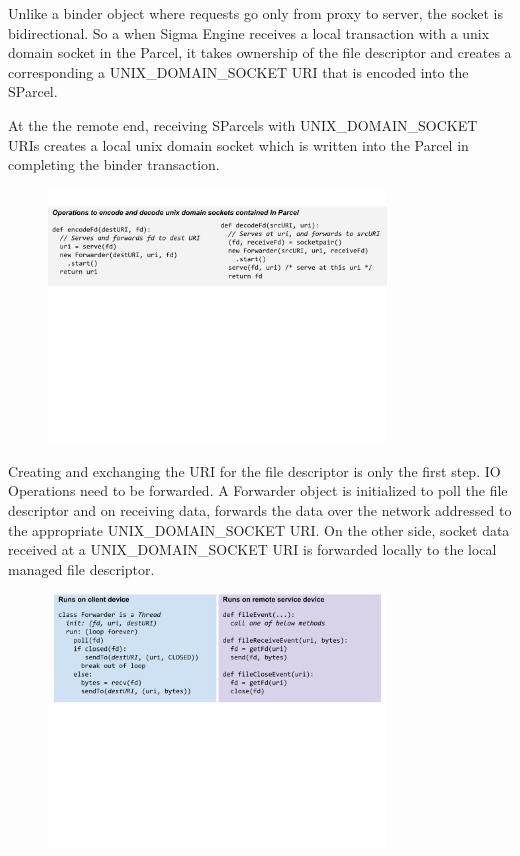 \documentclass[prodmode]{acmlarge}
\begin{document}
Unlike a binder object where requests go only from proxy to server, the socket is bidirectional. So a when Sigma Engine receives a local transaction with a unix domain socket in the Parcel, it takes ownership of the file descriptor and creates a corresponding a UNIX\_DOMAIN\_SOCKET URI that is encoded into the SParcel.

At the the remote end, receiving SParcels with UNIX\_DOMAIN\_SOCKET URIs creates a local unix domain socket which is written into the Parcel in completing the binder transaction.

\begin{figure}[h]
\centering
\includegraphics[width=0.8\textwidth]{drawings/encodeFds.pdf}
\end{figure}

Creating and exchanging the URI for the file descriptor is only the first step. IO Operations need to be forwarded. A Forwarder object is initialized to poll the file descriptor and on receiving data, forwards the data over the network addressed to the appropriate UNIX\_DOMAIN\_SOCKET URI. On the other side, socket data received at a UNIX\_DOMAIN\_SOCKET URI is forwarded locally to the local managed file descriptor.
\begin{figure}[h]
\centering
\includegraphics[width=0.8\textwidth]{drawings/forwardFds.pdf}
\end{figure}
\end{document}
